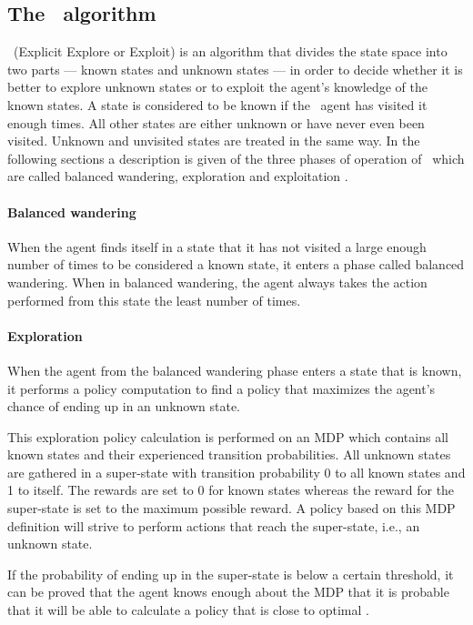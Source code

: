 \subsection{The \etre\ algorithm}
\label{sec:e3}

\etre\ (Explicit Explore or Exploit) is an algorithm that divides the state
space into two parts --- known states and unknown states --- in order to decide
whether it is better to explore unknown states or to exploit the agent's
knowledge of the known states. A state is considered to be known if the \etre\
agent has visited it enough times. All other states are either unknown or have
never even been visited. Unknown and unvisited states are treated in the same
way. In the following sections a description is given of the three phases of
operation of \etre\, which are called balanced wandering, exploration and
exploitation \parencite{kearns2002near}.

\paragraph{Balanced wandering}

When the agent finds itself in a state that it has not visited a large enough
number of times to be considered a known state, it enters a phase called
balanced wandering. When in balanced wandering, the agent always takes the
action performed from this state the least number of times. 


\paragraph{Exploration}

When the agent from the balanced wandering phase enters a state that is known,
it performs a policy computation to find a policy that maximizes the agent's
chance of ending up in an unknown state. 

This exploration policy calculation is performed on an MDP which contains all
known states and their experienced transition probabilities.  All unknown
states are gathered in a super-state with transition probability 0 to all known
states and 1 to itself. The rewards are set to 0 for known states whereas the
reward for the super-state is set to the maximum possible reward. A policy
based on this MDP definition will strive to perform actions that reach the
super-state, i.e., an unknown state.

If the probability of ending up in the super-state is below a certain threshold, it
can be proved that the agent knows enough about the MDP that it is probable
that it will be able to calculate a policy that is close to optimal
\parencite{kearns2002near}.



